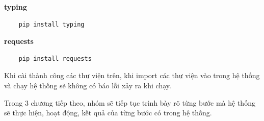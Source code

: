 \textbf{typing}
\begin{lstlisting}
	pip install typing
\end{lstlisting}

\textbf{requests}
\begin{lstlisting}
	pip install requests
\end{lstlisting}


Khi cài thành công các thư viện trên, khi import các thư viện vào trong hệ thống và chạy hệ thống sẽ không có báo lỗi xảy ra khi chạy.\newline

Trong 3 chương tiếp theo, nhóm sẽ tiếp tục trình bày rõ từng bước mà hệ thống sẽ thực hiện, hoạt động, kết quả của từng bước có trong hệ thống.